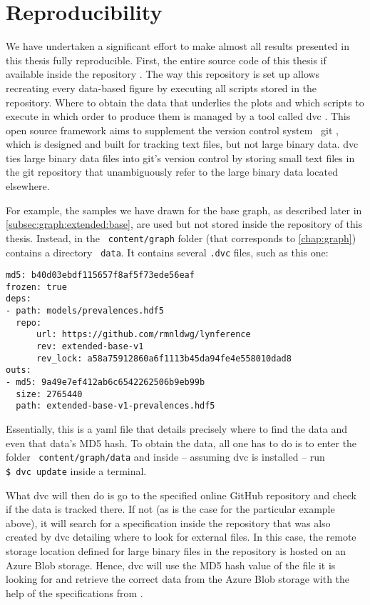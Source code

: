 \documentclass[\relativeRoot/main.tex]{subfiles}
\begin{document}
\section{Reproducibility}
\label{sec:intro:reproducibility}

We have undertaken a significant effort to make almost all results presented in this thesis fully reproducible. First, the entire source code of this thesis if available inside the repository . The way this repository is set up allows recreating every data-based figure by executing all scripts stored in the repository. Where to obtain the data that underlies the plots and which scripts to execute in which order to produce them is managed by a tool called \acrshort{dvc} \cite{noauthor_data_2022}. This open source framework aims to supplement the version control system ~git \cite{torvalds_git_2022}, which is designed and built for tracking text files, but not large binary data. \Acrshort{dvc} ties large binary data files into git's version control by storing small text files in the git repository that unambiguously refer to the large binary data located elsewhere.

For example, the samples we have drawn for the base graph, as described later in \cref{subsec:graph:extended:base}, are used but not stored inside the repository of this thesis. Instead, in  the ~\texttt{content/graph} folder (that corresponds to \cref{chap:graph}) contains a directory ~\texttt{data}. It contains several \texttt{.dvc} files, such as this one:

\begin{tcolorbox}[title=\faIcon{file-alt} \texttt{extended-base-v1-samples.hdf5.dvc}, parbox=false]
\begin{verbatim}
md5: b40d03ebdf115657f8af5f73ede56eaf
frozen: true
deps:
- path: models/prevalences.hdf5
  repo:
      url: https://github.com/rmnldwg/lynference
      rev: extended-base-v1
      rev_lock: a58a75912860a6f1113b45da94fe4e558010dad8
outs:
- md5: 9a49e7ef412ab6c6542262506b9eb99b
  size: 2765440
  path: extended-base-v1-prevalences.hdf5
\end{verbatim}
\end{tcolorbox}

Essentially, this is a \acrshort{yaml} file that details precisely where to find the data and even that data's MD5 hash. To obtain the data, all one has to do is to enter the folder ~\texttt{content/graph/data} and inside -- assuming \acrshort{dvc} is installed -- run \texttt{\$~dvc~update} inside a terminal.

What \acrshort{dvc} will then do is go to the specified online GitHub repository and check if the data is tracked there. If not (as is the case for the particular example above), it will search for a specification inside the repository that was also created by \acrshort{dvc} detailing where to look for external files. In this case, the remote storage location defined for large binary files in the  repository is hosted on an Azure Blob storage. Hence, \acrshort{dvc} will use the MD5 hash value of the file it is looking for and retrieve the correct data from the Azure Blob storage with the help of the specifications from .
\end{document}
